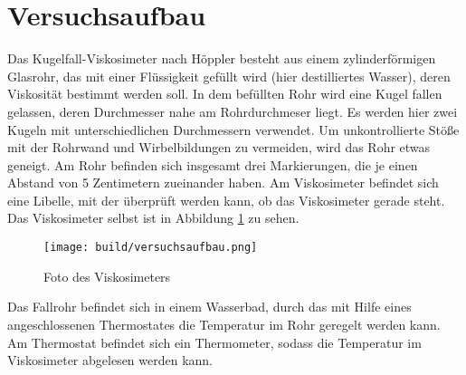 \section[]{Versuchsaufbau}
Das Kugelfall-Viskosimeter nach Höppler besteht aus einem zylinderförmigen Glasrohr,
das mit einer Flüssigkeit gefüllt wird (hier destilliertes Wasser), deren Viskosität bestimmt werden soll. 
In dem befüllten Rohr wird eine Kugel fallen gelassen, deren Durchmesser nahe am Rohrdurchmeser liegt.
Es werden hier zwei Kugeln mit unterschiedlichen Durchmessern verwendet. 
Um unkontrollierte Stöße mit der Rohrwand und Wirbelbildungen zu vermeiden, wird das Rohr etwas geneigt.
Am Rohr befinden sich insgesamt drei Markierungen, die je einen Abstand von 5 Zentimetern zueinander haben.
Am Viskosimeter befindet sich eine Libelle, mit der überprüft werden kann, ob das Viskosimeter gerade steht.
Das Viskosimeter selbst ist in Abbildung \ref{fig:viskosimeter} zu sehen.
\begin{figure}
    \centering
    \texttt{[image: build/versuchsaufbau.png]}
    \caption[]{Foto des Viskosimeters}
    \label{fig:viskosimeter}
\end{figure}
Das Fallrohr befindet sich in einem Wasserbad, durch das mit Hilfe eines angeschlossenen Thermostates die Temperatur im Rohr geregelt werden kann.
Am Thermostat befindet sich ein Thermometer, sodass die Temperatur im Viskosimeter abgelesen werden kann.

